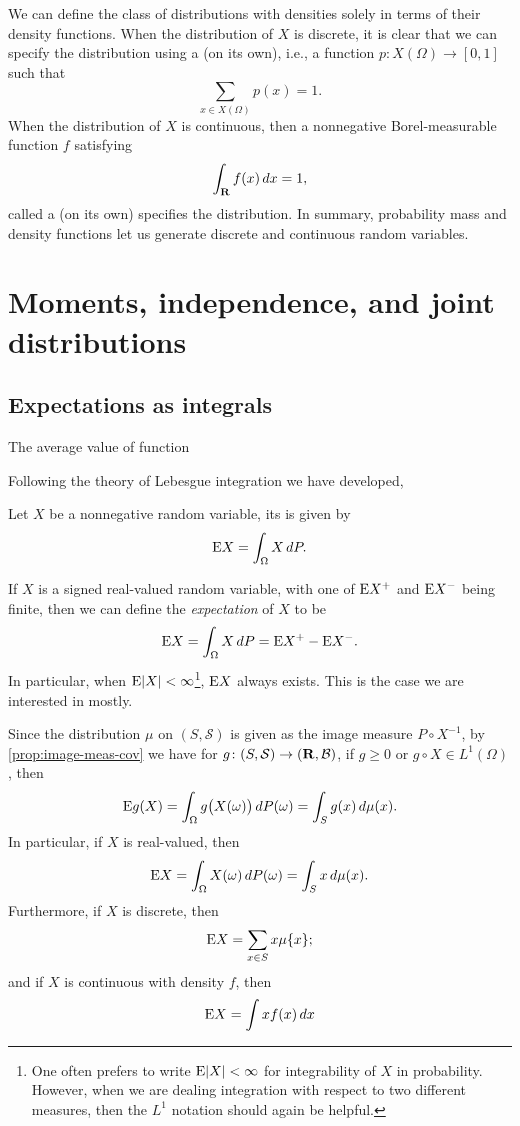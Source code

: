 We can define the class of distributions with densities solely in terms of their density functions. When the distribution of $X$ is discrete, it is clear that we can specify the distribution using a  (on its own), i.e., a function $p\colon X(\Omega) \to [0,1]$ such that \[\sum_{x\in X(\Omega)} p(x) = 1.\] When the distribution of $X$ is continuous, then a nonnegative Borel-measurable function $f$ satisfying \[
    \int_{\mathbf{R}} f(x)\,dx = 1,
\] called a  (on its own) specifies the distribution. In summary, probability mass and density functions let us generate discrete and continuous random variables.


\section{Moments, independence, and joint distributions} \label{sec:moment-indep-joint}

\subsection{Expectations as integrals}

The average value of function

Following the theory of Lebesgue integration we have developed, 

\begin{defn}
    Let $X$ be a nonnegative random variable, its  is given by \[
    \mathop{}\!\mathrm{E} X = \int_\Omega X\,dP.
    \]
    
    If $X$ is a signed real-valued random variable, with one of $\mathop{}\!\mathrm{E} X^+$ and $\mathop{}\!\mathrm{E} X^-$ being finite, then we can define the \emph{expectation} of $X$ to be \[
        \mathop{}\!\mathrm{E} X = \int_\Omega X\,dP = \mathop{}\!\mathrm{E} X^+ - \mathop{}\!\mathrm{E} X^-.
    \]
    In particular, when $\mathop{}\!\mathrm{E} \lvert X \rvert < \infty$\footnote{One often prefers to write $\mathop{}\!\mathrm{E}\lvert X \rvert < \infty$ for integrability of $X$ in probability. However, when we are dealing integration with respect to two different measures, then the $L^1$ notation should again be helpful.}, $\mathop{}\!\mathrm{E} X$ always exists. This is the case we are interested in mostly.
\end{defn}

Since the distribution $\mu$ on $(S,\mathcal{S})$ is given as the image measure $P\circ X^{-1}$, by \cref{prop:image-meas-cov} we have for $g\colon (S,\mathcal S) \to (\mathbf{R},\mathcal{B})$, if $g \geq 0$ or $g\circ X \in L^1(\Omega)$, then \[
    \mathop{}\!\mathrm{E} g(X) = \int_\Omega g\bigl(X(\omega)\bigr)\,dP(\omega) = \int_S g(x) \,d\mu(x).
\] In particular, if $X$ is real-valued, then \[
    \mathop{}\!\mathrm{E} X = \int_\Omega X(\omega)\,dP(\omega) = \int_S x\,d\mu(x).
\] Furthermore, if $X$ is discrete, then \[
    \mathop{}\!\mathrm{E} X = \sum_{x \in S} x \mu\{x\}; 
\] and if $X$ is continuous with density $f$, then \[
    \mathop{}\!\mathrm{E} X = \int x f(x)\,dx
\]

